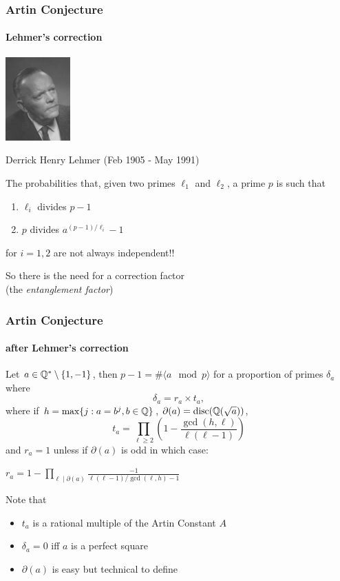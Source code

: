\documentclass[10pt,handout]{beamer} %
\begin{document}
\begin{frame}\frametitle{Artin Conjecture}
\framesubtitle{Lehmer's correction}

\centerline{\includegraphics[width=2.5cm]{images/lehmer.jpg}}

\centerline{Derrick Henry Lehmer (Feb 1905 -  May 1991)}
\pause

\begin{rem} The probabilities that, given two primes $\ell_1$ and $\ell_2$, a prime $p$
 is such that 
\begin{enumerate}
\item $\ell_i$ divides $p-1$
\item $p$ divides $a^{(p-1)/\ell_i}-1$
\end{enumerate}
for $i=1,2$ are not always independent!!
\end{rem}

So there is the need for a correction factor\\ \pause
 (the \emph{entanglement factor})
\end{frame}

\begin{frame}\frametitle{Artin Conjecture}
\framesubtitle{after Lehmer's correction}

\begin{conj} Let $a\in\mathbb Q^*\setminus\{1,-1\}$, then $p-1=\#\langle a\mod p\rangle$
 for a proportion of primes $\delta_a$ where
 $$\delta_a=r_a\times t_a,$$
 where if $h=\max\{j: a=b^j,b\in\mathbb Q\}$, $\partial(a)=\operatorname{disc}(\mathbb Q(\sqrt{a}))$,
 $$t_a=\prod_{\ell\ge2}\left(1-\frac{\gcd(h,\ell)}{\ell(\ell-1)}\right)$$
 and $r_a=1$ unless if $\partial(a)$ is odd in which case:\\
\centerline{ $r_a=1-\prod_{\ell\mid \partial(a)}\frac{-1}{\ell(\ell-1)/\gcd(\ell,h)-1}$}
\end{conj}

Note that
\begin{itemize}[<+-|alert@+>]
\item $t_a$ is a rational  multiple of the Artin Constant $A$
\item  $\delta_a=0$ iff $a$ is a perfect square
\item  $\partial(a)$ is easy but technical to define
\end{itemize}
\end{frame}
\end{document}
